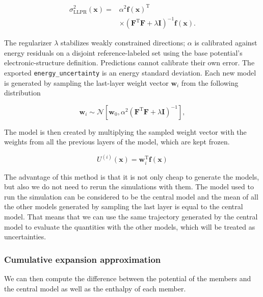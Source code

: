 \documentclass[12pt,a4paper]{article}
\numberwithin{equation}{section}
\begin{document}
\begin{equation}
  \begin{aligned}
  \sigma_{\mathrm{LLPR}}^2(\bm x)
  ={}&\alpha^2\bm f(\bm x)^{\mathrm T}
  \\
  &\times\left(\bm F^{\mathrm T}\bm F
        +\lambda\bm I\right)^{-1}\bm f(\bm x).
  \end{aligned}
  \label{eq:llpr-variance}
\end{equation}

The regularizer $\lambda$ stabilizes weakly constrained directions; $\alpha$
is calibrated against energy residuals on a disjoint reference-labeled set
using the base potential's electronic-structure definition. Predictions
cannot calibrate their own error. The exported \texttt{energy\_\allowbreak{}uncertainty} is an energy standard deviation.
Each new model is generated by sampling the last-layer weight vector $\bm w_i$ from the following distribution

\begin{equation}
  \bm w_i\sim\mathcal N\!\left[
    \bm w_0,
    \alpha^2\left(\bm F^{\mathrm T}\bm F+\lambda\bm I\right)^{-1}\right],
    \label{eq:llpr-members}
\end{equation}

The model is then created by multiplying the sampled weight vector with the weights from all the previous layers of the model, which are kept frozen.

\begin{equation}
  U^{(i)}(\bm x)=\bm w_i^{\mathrm T}\bm f(\bm x)
  \label{eq:llpr-member-energy}
\end{equation}

The advantage of this method is that it is not only cheap to generate the models, but also we do not need to rerun the simulations with them.
The model used to run the simulation can be considered to be the central model and the mean of all the other models generated by sampling the last layer is equal to the central model.
That means that we can use the same trajectory generated by the central model to evaluate the quantities with the other models,
which will be treated as uncertainties.

\subsubsection{Cumulative expansion approximation}

We can then compute the difference between the potential of the members and the central model as well as the enthalpy of each member.
\end{document}
